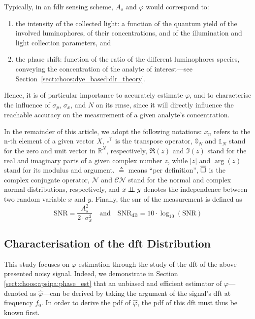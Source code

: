 Typically, in an \gls{fdlr} sensing scheme, $A_s$ and $\varphi$ would correspond to:
\begin{enumerate}
	\item the intensity of the collected light: a function of the quantum yield of the involved luminophores, of their concentrations, and of the illumination and light collection parameters, and
	\item the phase shift: function of the ratio of the different luminophores species, conveying the concentration of the analyte of interest---see Section~\ref{sect:choos:dye_based:dlr_theory}.
\end{enumerate}

Hence, it is of particular importance to accurately estimate $\varphi$, and to characterise the influence of $\sigma_p$, $\sigma_x$, and $N$ on its \gls{rmse}, since it will directly influence the reachable accuracy on the measurement of a given analyte's concentration.

In the remainder of this article, we adopt the following notations: $x_n$ refers to the n-th element of a given vector $X$, $\square^\intercal$ is the transpose operator, $\mathbb{0}_N$ and $\mathbb{1}_N$ stand for the zero and unit vector in $\mathbb{R}^N$, respectively, $\Re(z)$ and $\Im(z)$ stand for the real and imaginary parts of a given complex number $z$, while $\lvert z \rvert$ and $\arg (z)$ stand for its modulus and argument. $\triangleq$ means \enquote{per definition}, $\overline{\mbox{$\square$\mathstrut}}$ is the complex conjugate operator, $\mathcal{N}$ and $\mathcal{CN}$ stand for the normal and complex normal distributions, respectively, and $x \mathrel{\perp\!\!\!\perp} y$ denotes the independence between two random variable $x$ and $y$. Finally, the \gls{snr} of the measurement is defined as
\begin{equation}
	\text{SNR} = \frac{A_s^2}{2 \cdot \sigma_x^2} \quad \text{and} \quad \text{SNR}_{\text{dB}} = 10 \cdot \log_{10} (\text{SNR})
\end{equation}

\subsection{Characterisation of the \texorpdfstring{\gls{dft}}{DFT} Distribution}

This study focuses on $\varphi$ estimation through the study of the \gls{dft} of the above-presented noisy signal. Indeed, we demonstrate in Section \ref{sect:choos:apsipa:phase_est} that an unbiased and efficient estimator of $\varphi$---denoted as $\widehat{\varphi}$---can be derived by taking the argument of the signal's \gls{dft} at frequency $f_0$. In order to derive the \gls{pdf} of $\widehat{\varphi}$, the \gls{pdf} of this \gls{dft} must thus be known first.

